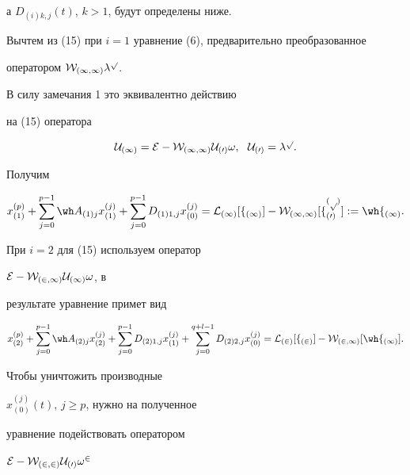 а $D_{(i)k,j}(t)$, $k>1$, будут определены ниже.





Вычтем из (15) при $i=1$ уравнение (6), предварительно преобразованное


оператором $\cal W_{(1,1)}\lambda^p$.


В силу замечания 1 это эквивалентно действию


на (15) оператора 


\begin{equation}


\cal U_{(1)}=\cal E-\cal W_{(1,1)} \cal U_{(0)}\omega,


\ \ \cal U_{(0)}= \lambda^p.


\end{equation}


Получим


$$


x_{(1)}^{(p)} +


\sum_{j=0}^{p-1}{\wh A_{(1)j}x_{(1)}^{(j)}} +


\sum_{j=0}^{p-1}{D_{(1)1,j}x_{(0)}^{(j)}}=\cal L_{(1)}[f_{(1)}]-


\cal W_{(1,1)}[f_{(0)}^{(p)}]


:= \wh f_{(1)}.


$$





При $i=2$ для (15) используем оператор


$\cal E-\cal W_{(2,1)} \cal U_{(1)}\omega$, в 


результате уравнение примет вид


$$


x_{(2)}^{(p)} +


\sum_{j=0}^{p-1}{\wh A_{(2)j}x_{(2)}^{(j)}} + 


\sum_{j=0}^{p-1}{D_{(2)1,j}x_{(1)}^{(j)}} +


\sum_{j=0}^{q+l-1}{D_{(2)2,j}x_{(0)}^{(j)}}


=\cal L_{(2)}[f_{(2)}]-


\cal W_{(2,1)}[\wh f_{(1)}].


$$





Чтобы уничтожить производные


$x_{(0)}^{(j)}(t)$, $j\ge p$, нужно на полученное 


уравнение подействовать оператором


$\cal E-\cal W_{(2,2)} \cal U_{(0)}\omega^2$


